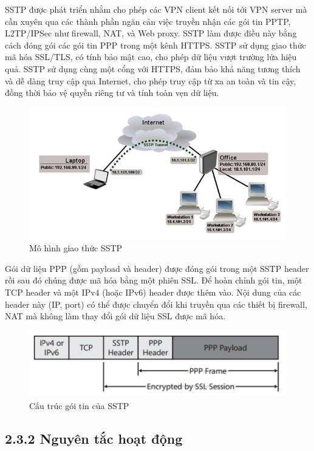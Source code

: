  SSTP được phát triển nhằm cho phép các VPN client kết nối tới VPN server mà cần xuyên qua các thành phần ngăn cản việc truyền nhận các gói tin PPTP, L2TP/IPSec như firewall, NAT, và Web proxy. SSTP làm được điều này bằng cách đóng gói các gói tin PPP trong một kênh HTTPS. SSTP sử dụng giao thức mã hóa SSL/TLS, có tính bảo mật cao, cho phép dữ liệu vượt trường lửa hiệu quả. SSTP sử dụng cùng một cổng với HTTPS, đảm bảo khả năng tương thích và dễ dàng truy cập qua Internet, cho phép truy cập từ xa an toàn và tin cậy, đồng thời bảo vệ quyền riêng tư và tính toàn vẹn dữ liệu.
\newpage
  \begin{figure}[htbp]
        \centering
        \includegraphics[width=0.8\linewidth]{img/sstp.jpeg}
        \caption{Mô hình giao thức SSTP}
    \end{figure}

 Gói dữ liệu PPP (gồm payload và header) được đóng gói trong một SSTP header rồi sau đó chúng được mã hóa bằng một phiên SSL. Để hoàn chỉnh gói tin, một TCP header và một IPv4 (hoặc IPv6) header được thêm vào. Nội dung của các header này (IP, port) có thể được chuyển đổi khi truyền qua các thiết bị firewall, NAT mà không làm thay đổi gói dữ liệu SSL được mã hóa.

     \begin{figure}[htbp]
        \centering
        \includegraphics[width=0.8\linewidth]{img/sstp-packet-structure.png}
        \caption{Cấu trúc gói tin của SSTP}
    \end{figure}
  \subsection*{2.3.2 Nguyên tắc hoạt động}

